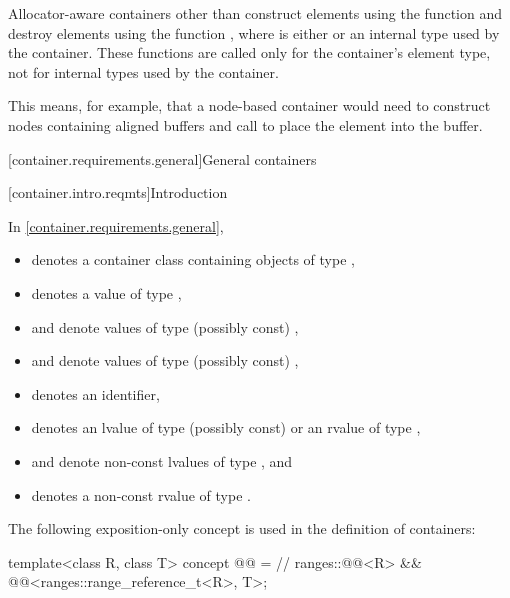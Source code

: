 \pnum
Allocator-aware containers
other than  construct elements using the function
and destroy elements using the function
,
where  is either  or
an internal type used by the container.
These functions are called only for the
container's element type, not for internal types used by the container.
\begin{note}
This
means, for example, that a node-based container would need to construct nodes containing
aligned buffers and call  to place the element into the buffer.
\end{note}

[container.requirements.general]{General containers}

[container.intro.reqmts]{Introduction}

\pnum
In \ref{container.requirements.general},
\begin{itemize}
\item
{} denotes a container class containing objects of type ,
\item
{} denotes a value of type ,
\item
{} and  denote values of type (possibly const) ,
\item
{} and  denote values of type (possibly const) ,
\item
{} denotes an identifier,
\item
{} denotes an lvalue of type (possibly const)  or
an rvalue of type ,
\item
{} and  denote non-const lvalues of type , and
\item
{} denotes a non-const rvalue of type .
\end{itemize}

\pnum
The following exposition-only concept is used in the definition of containers:
\begin{codeblock}
template<class R, class T>
concept @@ =    // \expos
  ranges::@@<R> && @@<ranges::range_reference_t<R>, T>;
\end{codeblock}

